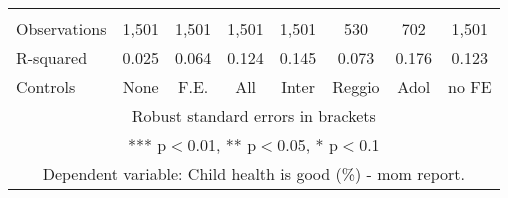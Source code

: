 \begin{tabular}{lccccccc}
 &  &  &  &  &  &  &  \\
Observations & 1,501 & 1,501 & 1,501 & 1,501 & 530 & 702 & 1,501 \\
R-squared & 0.025 & 0.064 & 0.124 & 0.145 & 0.073 & 0.176 & 0.123 \\
 Controls & None & F.E. & All & Inter & Reggio & Adol & no FE \\ \hline
\multicolumn{8}{c}{ Robust standard errors in brackets} \\
\multicolumn{8}{c}{ *** p$<$0.01, ** p$<$0.05, * p$<$0.1} \\
\multicolumn{8}{c}{ Dependent variable: Child health is good (\%) - mom report.} \\
\end{tabular}
